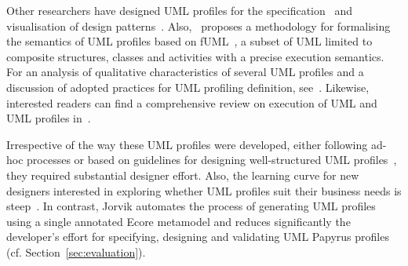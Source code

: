 Other researchers have designed UML profiles for the specification~\cite{Debnath2006:ICCSA,Mak2004:ICSE} and visualisation of design patterns~\cite{Dong2007:TSE}. 
Also,~\cite{tatibouet2014formalizing} proposes a methodology for formalising the semantics of UML profiles based on fUML~\cite{fuml}, a subset of UML limited to composite structures, classes and activities with a precise execution semantics. 
For an analysis of qualitative characteristics of several UML profiles and a discussion of adopted practices for UML profiling definition, see~\cite{Pardillo2010:MODELS}.
Likewise, interested readers can find a comprehensive review on execution of UML and UML profiles in~\cite{ciccozzi2018execution}.

Irrespective of the way these UML profiles were developed, either 
following ad-hoc processes or based on guidelines for designing well-structured 
UML profiles~\cite{FuentesFernandez2004:UMLME,Selic2007:ISORC},
they required substantial designer effort. Also, the learning 
curve for new designers interested in exploring whether UML profiles suit their 
business needs is steep~\cite{Giachetti2009:CAISE}.
In contrast, Jorvik automates the process of generating UML profiles using a single annotated Ecore metamodel and reduces significantly the developer's effort for specifying, designing and validating UML Papyrus profiles (cf. Section~\ref{sec:evaluation}).

